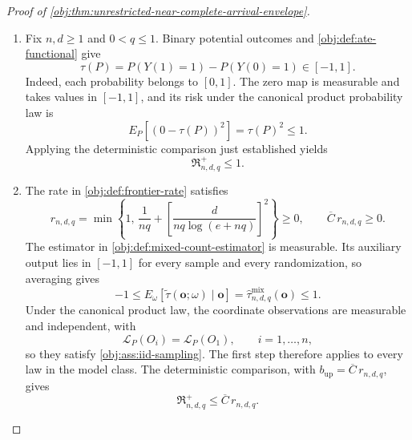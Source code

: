 \documentclass[11pt]{article}
\begin{document}
\begin{proof}[Proof of \cref{obj:thm:unrestricted-near-complete-arrival-envelope}]
\begin{enumerate}
\item Fix \(n,d\ge1\) and \(0<q\le1\). Binary potential outcomes and
\cref{obj:def:ate-functional} give
\[
\tau(P)=P(Y(1)=1)-P(Y(0)=1)\in[-1,1].
\]
Indeed, each probability belongs to \([0,1]\). The zero map is measurable and takes values in \([-1,1]\), and its risk under the canonical product probability law is
\[
E_P\!\left[(0-\tau(P))^2\right]=\tau(P)^2\le1.
\]
Applying the deterministic comparison just established yields
\[
\mathfrak R^{+}_{n,d,q}\le1.
\]

\item The rate in \cref{obj:def:frontier-rate} satisfies
\[
r_{n,d,q}
=
\min\left\{
1,\,
\frac1{nq}
+
\left[\frac{d}{nq\log(e+nq)}\right]^2
\right\}\ge0,
\qquad
\overline C\,r_{n,d,q}\ge0.
\]
The estimator in \cref{obj:def:mixed-count-estimator} is measurable. Its auxiliary output lies in \([-1,1]\) for every sample and every randomization, so averaging gives
\[
-1
\le
E_\omega\!\left[
\widetilde\tau(\mathbf o;\omega)\mid\mathbf o
\right]
=
\widehat\tau^{\mathrm{mix}}_{n,d,q}(\mathbf o)
\le1.
\]
Under the canonical product law, the coordinate observations are measurable and independent, with
\[
\mathcal L_P(O_i)=\mathcal L_P(O_1),
\qquad i=1,\ldots,n,
\]
so they satisfy \cref{obj:ass:iid-sampling}. The first step therefore applies to every law in the model class. The deterministic comparison, with \(b_{\mathrm{up}}=\overline C\,r_{n,d,q}\), gives
\[
\mathfrak R^{+}_{n,d,q}\le\overline C\,r_{n,d,q}.
\]


\end{enumerate}
\end{proof}
\end{document}
